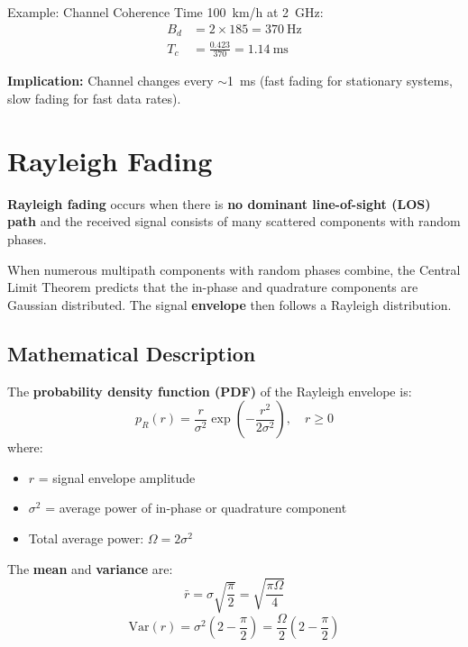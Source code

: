 \begin{calloutbox}{Example: Channel Coherence Time}
100~km/h at 2~GHz:
\begin{align*}
B_d &= 2 \times 185 = 370~\text{Hz} \\
T_c &= \frac{0.423}{370} = 1.14~\text{ms}
\end{align*}

\textbf{Implication:} Channel changes every $\sim$1~ms (fast fading for stationary systems, slow fading for fast data rates).
\end{calloutbox}

\section{Rayleigh Fading}

\textbf{Rayleigh fading} occurs when there is \textbf{no dominant line-of-sight (LOS) path} and the received signal consists of many scattered components with random phases.

\begin{keyconcept}
When numerous multipath components with random phases combine, the Central Limit Theorem predicts that the in-phase and quadrature components are Gaussian distributed. The signal \textbf{envelope} then follows a Rayleigh distribution.
\end{keyconcept}

\subsection{Mathematical Description}

The \textbf{probability density function (PDF)} of the Rayleigh envelope is:
\begin{equation}
p_R(r) = \frac{r}{\sigma^2} \exp\left(-\frac{r^2}{2\sigma^2}\right), \quad r \geq 0
\end{equation}
where:
\begin{itemize}
\item $r$ = signal envelope amplitude
\item $\sigma^2$ = average power of in-phase or quadrature component
\item Total average power: $\Omega = 2\sigma^2$
\end{itemize}

The \textbf{mean} and \textbf{variance} are:
\begin{equation}
\bar{r} = \sigma\sqrt{\frac{\pi}{2}} = \sqrt{\frac{\pi \Omega}{4}}
\end{equation}
\begin{equation}
\text{Var}(r) = \sigma^2\left(2 - \frac{\pi}{2}\right) = \frac{\Omega}{2}\left(2 - \frac{\pi}{2}\right)
\end{equation}

